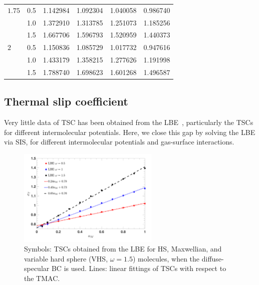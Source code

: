 \begin{table}[t]
\begin{tabular}{lccccr}
			$1.75$
			& 0.5   & 1.142984   & 1.092304   & 1.040058   & 0.986740\\
			&1.0    & 1.372910   & 1.313785   & 1.251073   & 1.185256 \\
			&1.5    & 1.667706   & 1.596793   & 1.520959   &  1.440373  \\
			
			$2$
			& 0.5   & 1.150836   & 1.085729   &1.017732 & 0.947616\\
			&1.0    & 1.433179   & 1.358215   &1.277626  &1.191998 \\
			&1.5    & 1.788740   & 1.698623   &1.601268 &  1.496587\\
			\hline 
		\end{tabular}
\end{table}




\subsection{Thermal slip coefficient}

Very little data of TSC has been obtained from the LBE~\cite{wakabayashi1996numerical,siewert2003linearized}, particularly the TSCs for different  intermolecular potentials. Here, we close this gap by solving the LBE via SIS, for different intermolecular potentials and gas-surface interactions.

\begin{figure}
	\centering
	\includegraphics[width=0.6\textwidth]{SlipJump/IMG/ThermalCoe_MaxBound}
	\caption{Symbols: TSCs obtained from the LBE for HS, Maxwellian, and variable hard sphere (VHS, $\omega=1.5$) molecules, when the diffuse-specular BC is used. Lines: linear fittings of TSCs with respect to the TMAC. }
	\label{fig:TSC_Bound0}
\end{figure}



